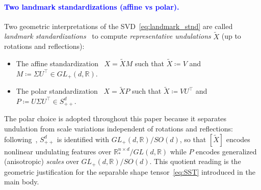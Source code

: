 \documentclass[pdflatex,iicol]{sn-jnl}%
\theoremstyle{thmstyleone}%
\theoremstyle{thmstyletwo}%
\theoremstyle{thmstylethree}%
\begin{document}
\begin{appendices}
\textcolor{blue}{\paragraph{Two landmark standardizations (affine vs polar).}}
Two geometric interpretations of the SVD~\eqref{eq:landmark_stnd} are called \emph{landmark standardizations}~\cite{bryner20142d, grey2023separable, srivastava2016functional} to compute \textit{representative undulations} $\widetilde{X}$ (up to rotations and reflections):
\begin{itemize}
    \item The affine standardization~\cite{bryner20142d} $X = \widetilde{X}M$ such that
    $\widetilde{X} \coloneqq V$ and $ M \coloneqq \Sigma U^{\top} \in GL_+(d,\mathbb{R})$.
    \item The polar standardization~\cite{grey2023separable} $X = \widetilde{X}P$ such that
    $\widetilde{X} \coloneqq VU^{\top}$ and $P \coloneqq U\Sigma U^{\top}\in S^d_{++}$.
\end{itemize}
The polar choice is adopted throughout this paper because it separates undulation from scale variations independent of rotations and reflections: following~\cite{fletcher2003statistics}, $S^d_{++}$ is identified with $GL_+(d,\mathbb{R})/SO(d)$, so that $[\widetilde{X}]$ encodes nonlinear undulating features over $\mathbb{R}^{n \times d}_*/GL(d,\mathbb{R})$ while $P$ encodes generalized (anisotropic) \emph{scales} over $GL_+(d,\mathbb{R})/SO(d)$. This quotient reading is the geometric justification for the separable shape tensor~\eqref{eq:SST} introduced in the main body.


\end{appendices}
\end{document}

